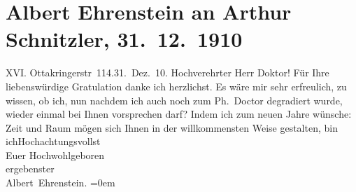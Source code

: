 

         \renewcommand{\erwaehnteOrte}{Orte: Ottakringerstraße, Wien}
         \renewcommand{\erwaehnteWerke}{}
               \section[Albert Ehrenstein an Arthur Schnitzler, 31. 12. 1910]{ Albert Ehrenstein an Arthur Schnitzler, 31. 12. 1910}\nopagebreak{}\rehead{ }\begin{ledgroupsized}[t]{13cm}\normalsize\beginnumbering \toendnotes[C]{\smallbreak\pagebreak[2]} 
\pstart
           {\pb}XVI. Ottakringerstr 114.\hfill 31. Dez. 10.\pend
           \pstart\center{}Hochverehrter Herr Doktor!\pend\pstart
           Für Ihre liebenswürdige Gratulation danke ich herzlichst.\pend
           \pstart
           Es wäre mir sehr erfreulich, zu wissen, ob ich, nun nachdem ich auch noch zum
                    Ph. Doctor degradiert wurde, wieder einmal bei Ihnen vorsprechen darf?\pend
           \pstart
           Indem ich zum neuen Jahre wünsche: Zeit und Raum mögen sich Ihnen in der
                    willkommensten Weise gestalten,\pend
           \pstart
           bin ich\hspace*{2em}Hochachtungsvollst{\\[\baselineskip]}Euer Hochwohlgeboren{\\[\baselineskip]}ergebenster{\\[\baselineskip]}\spacefill\mbox{Albert Ehrenstein.}\pend
           \leftskip=0em{}
         
         \endnumbering{}\end{ledgroupsized}  \newcommand{\dateiname}{L01997}\newcommand{\titel}{Albert Ehrenstein an Arthur Schnitzler, 31. 12. 1910}\newcommand{\editorInnen}{Martin Anton Müller und Gerd-Hermann Susen}
      
